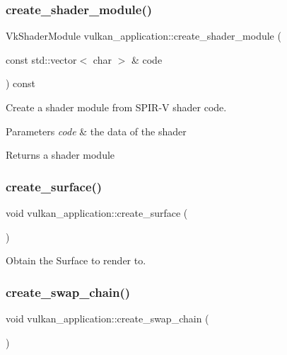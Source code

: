 \subsubsection{\texorpdfstring{create\+\_\+shader\+\_\+module()}{create\_shader\_module()}}
{\footnotesize\ttfamily Vk\+Shader\+Module vulkan\+\_\+application\+::create\+\_\+shader\+\_\+module (\begin{DoxyParamCaption}\item[{const std\+::vector$<$ char $>$ \&}]{code }\end{DoxyParamCaption}) const\hspace{0.3cm}{\ttfamily [private]}}



Create a shader module from S\+P\+I\+R-\/V shader code. 


\begin{DoxyParams}{Parameters}
{\em code} & the data of the shader \\
\hline
\end{DoxyParams}
\begin{DoxyReturn}{Returns}
a shader module 
\end{DoxyReturn}
\mbox{\label{classvulkan__application_a53302651b78b29d293cf912542fa8438}} 
\subsubsection{\texorpdfstring{create\+\_\+surface()}{create\_surface()}}
{\footnotesize\ttfamily void vulkan\+\_\+application\+::create\+\_\+surface (\begin{DoxyParamCaption}{ }\end{DoxyParamCaption})\hspace{0.3cm}{\ttfamily [private]}}



Obtain the Surface to render to. 

\mbox{\label{classvulkan__application_a2a747a8bf6911b9aa0113220640e70ea}} 
\subsubsection{\texorpdfstring{create\+\_\+swap\+\_\+chain()}{create\_swap\_chain()}}
{\footnotesize\ttfamily void vulkan\+\_\+application\+::create\+\_\+swap\+\_\+chain (\begin{DoxyParamCaption}{ }\end{DoxyParamCaption})\hspace{0.3cm}{\ttfamily [private]}}



